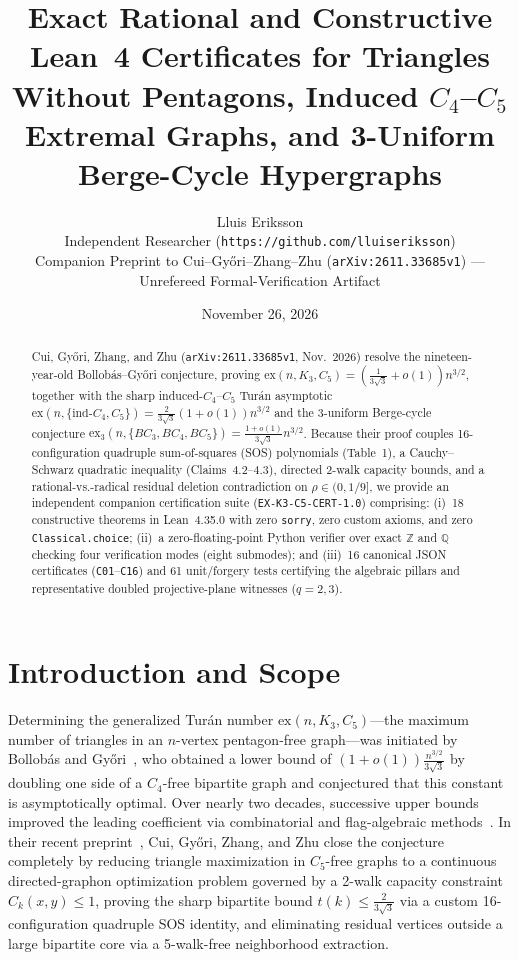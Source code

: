 \documentclass[10pt,twocolumn]{article}
\title{\vspace{-1.2em}\textbf{Exact Rational and Constructive Lean~4 Certificates for Triangles Without Pentagons, Induced $C_4$--$C_5$ Extremal Graphs, and 3-Uniform Berge-Cycle Hypergraphs}\vspace{-0.4em}}
\author{Lluis Eriksson\\
\small Independent Researcher (\nolinkurl{https://github.com/lluiseriksson})\\
\small Companion Preprint to Cui--Gy\H{o}ri--Zhang--Zhu (\texttt{arXiv:2611.33685v1}) --- Unrefereed Formal-Verification Artifact\vspace{-0.6em}}
\date{November 26, 2026}
\begin{document}
\maketitle

\begin{abstract}
\noindent Cui, Gy\H{o}ri, Zhang, and Zhu (\texttt{arXiv:2611.33685v1}, Nov.~2026) resolve the nineteen-year-old Bollob\'as--Gy\H{o}ri conjecture, proving $\mathrm{ex}(n, K_3, C_5) = (\tfrac{1}{3\sqrt{3}} + o(1))n^{3/2}$, together with the sharp induced-$C_4$--$C_5$ Tur\'an asymptotic $\mathrm{ex}(n,\{\mathrm{ind}\text{-}C_4, C_5\}) = \tfrac{2}{3\sqrt{3}}(1+o(1))n^{3/2}$ and the 3-uniform Berge-cycle conjecture $\mathrm{ex}_3(n,\{BC_3,BC_4,BC_5\}) = \tfrac{1+o(1)}{3\sqrt{3}}n^{3/2}$. Because their proof couples 16-configuration quadruple sum-of-squares (SOS) polynomials (Table~1), a Cauchy--Schwarz quadratic inequality (Claims~4.2--4.3), directed 2-walk capacity bounds, and a rational-vs.-radical residual deletion contradiction on $\rho \in (0, 1/9]$, we provide an independent companion certification suite (\texttt{EX-K3-C5-CERT-1.0}) comprising: (i)~18 constructive theorems in Lean~4.35.0 with zero \texttt{sorry}, zero custom axioms, and zero \texttt{Classical.choice}; (ii)~a zero-floating-point Python verifier over exact $\mathbb{Z}$ and $\mathbb{Q}$ checking four verification modes (eight submodes); and (iii)~16 canonical JSON certificates (\texttt{C01}--\texttt{C16}) and 61 unit/forgery tests certifying the algebraic pillars and representative doubled projective-plane witnesses ($q=2,3$).
\end{abstract}

\section{Introduction and Scope}
Determining the generalized Tur\'an number $\mathrm{ex}(n, K_3, C_5)$---the maximum number of triangles in an $n$-vertex pentagon-free graph---was initiated by Bollob\'as and Gy\H{o}ri~\cite{BollobasGyori2008}, who obtained a lower bound of $(1+o(1))\tfrac{n^{3/2}}{3\sqrt{3}}$ by doubling one side of a $C_4$-free bipartite graph and conjectured that this constant is asymptotically optimal. Over nearly two decades, successive upper bounds improved the leading coefficient via combinatorial and flag-algebraic methods~\cite{GyoriLi2012,AlonShikhelman2016,ErgemlidzeGyoriMethukuSalia2019,Razborov2007}. In their recent preprint~\cite{CuiGyoriZhangZhu2026}, Cui, Gy\H{o}ri, Zhang, and Zhu close the conjecture completely by reducing triangle maximization in $C_5$-free graphs to a continuous directed-graphon optimization problem governed by a 2-walk capacity constraint $C_k(x,y) \le 1$, proving the sharp bipartite bound $t(k) \le \tfrac{2}{3\sqrt{3}}$ via a custom 16-configuration quadruple SOS identity, and eliminating residual vertices outside a large bipartite core via a 5-walk-free neighborhood extraction.
\end{document}
